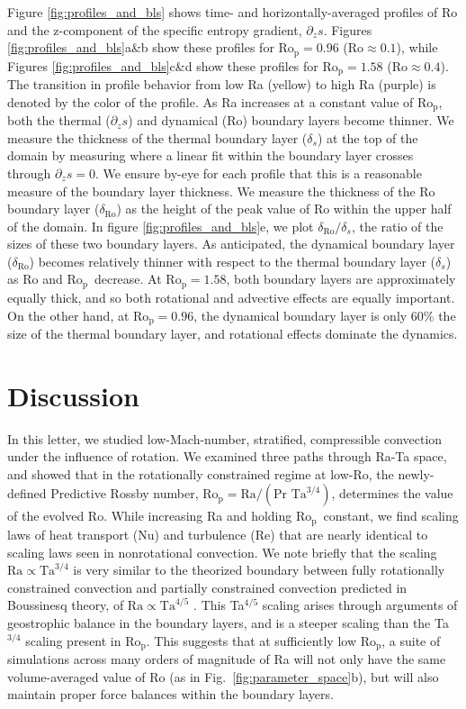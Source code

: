 \documentclass[twocolumn, amsmath, amsfonts, amssymb]{aastex62}
\newcommand{\pro}{\ensuremath{\text{Ro}_{\text{p}}}}
\begin{document}
Figure \ref{fig:profiles_and_bls} shows time- and horizontally-averaged profiles of
Ro and the z-component of the specific entropy gradient, $\partial_z s$.
Figures \ref{fig:profiles_and_bls}a\&b show these profiles for $\pro=0.96$ ($\text{Ro} \approx 0.1$), while
Figures \ref{fig:profiles_and_bls}c\&d show these profiles for $\pro=1.58$ ($\text{Ro} \approx 0.4$). The transition
in profile behavior from low Ra (yellow) to high Ra (purple) is denoted by the color of the
profile.
As Ra increases at a constant value of
\pro, both the thermal ($\partial_z s$) and dynamical (Ro) boundary layers become thinner. 
We measure the
thickness of the thermal boundary layer ($\delta_{s}$) at the top of the domain by 
measuring where a linear fit within the boundary layer crosses through $\partial_z s = 0$.
We ensure by-eye for each profile that this is a reasonable measure of the boundary
layer thickness. We measure
the thickness of the Ro boundary layer ($\delta_{\text{Ro}}$) 
as the height of the peak value of Ro within the
upper half of the domain.
In figure \ref{fig:profiles_and_bls}e, we plot $\delta_{\text{Ro}}/\delta_{s}$, the ratio
of the sizes of these two boundary layers. As anticipated, the dynamical boundary layer ($\delta_{\text{Ro}}$)
becomes relatively thinner with respect to the thermal boundary layer ($\delta_{s}$)
as Ro and \pro$\,$ decrease. At $\pro = 1.58$, both boundary layers are approximately equally
thick, and so both rotational and advective effects are equally important. On the other hand,
at $\pro = 0.96$, the dynamical boundary layer is only 60\% the size of the thermal boundary
layer, and rotational effects dominate the dynamics.

\section{Discussion}
\label{sec:discussion}
In this letter, we studied low-Mach-number, stratified, compressible convection 
under the influence of rotation.
We examined three paths through Ra-Ta space, and showed that in the rotationally
constrained regime at low-Ro, the newly-defined 
Predictive Rossby number, $\pro = \text{Ra}/(\text{Pr }\text{Ta}^{3/4})$, determines the value of
the evolved Ro. While increasing Ra and holding \pro$\,$ constant,
we find scaling laws of heat transport (Nu) and turbulence (Re) that are nearly identical
to scaling laws seen in nonrotational convection.
We note briefly that the scaling $\text{Ra} \propto \text{Ta}^{3/4}$ is very similar to
the theorized boundary between fully rotationally constrained convection and 
partially constrained convection predicted in Boussinesq theory, of 
$\text{Ra} \propto \text{Ta}^{4/5}$ \citep{julien&all2012, gastine&all2016}. This
Ta$^{4/5}$ scaling arises through arguments of geostrophic balance in the boundary layers,
and is a steeper scaling than the Ta$^{3/4}$ scaling present in \pro.
This suggests that at sufficiently low \pro, a suite of simulations across many orders
of magnitude of Ra will not only have the same volume-averaged value of Ro 
(as in Fig.~\ref{fig:parameter_space}b), but will
also maintain proper force balances within the boundary layers.
\end{document}
